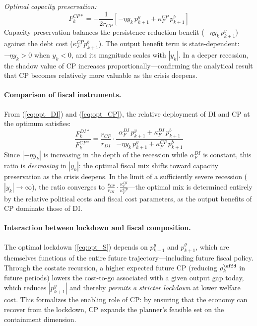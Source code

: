 \documentclass[12pt, a4paper]{article}
\begin{document}
\medskip
\noindent\textit{Optimal capacity preservation:}
%
\begin{equation}
    F_k^{CP*} = -\frac{1}{2 r_{CP}}\left[
      -\eta y_k \, p_{k+1}^y
      + \kappa_F^{CP} \, p_{k+1}^b
    \right]
    \label{eq:opt_CP}
\end{equation}
%
Capacity preservation balances the persistence reduction benefit ($-\eta y_k \, p_{k+1}^y$) against the debt cost ($\kappa_F^{CP} p_{k+1}^b$). The output benefit term is state-dependent: $-\eta y_k > 0$ when $y_k < 0$, and its magnitude scales with $|y_k|$. In a deeper recession, the shadow value of CP increases proportionally---confirming the analytical result that CP becomes relatively more valuable as the crisis deepens.

\paragraph{Comparison of fiscal instruments.} From (\ref{eq:opt_DI}) and (\ref{eq:opt_CP}), the relative deployment of DI and CP at the optimum satisfies:
%
\begin{equation}
    \frac{F_k^{DI*}}{F_k^{CP*}} =
    \frac{r_{CP}}{r_{DI}} \cdot
    \frac{\alpha_F^{DI} \, p_{k+1}^y + \kappa_F^{DI} \, p_{k+1}^b}
         {-\eta y_k \, p_{k+1}^y + \kappa_F^{CP} \, p_{k+1}^b}
    \label{eq:ratio_DI_CP}
\end{equation}
%
Since $|{-\eta y_k}|$ is increasing in the depth of the recession while $\alpha_F^{DI}$ is constant, this ratio is \textit{decreasing} in $|y_k|$: the optimal fiscal mix shifts toward capacity preservation as the crisis deepens. In the limit of a sufficiently severe recession ($|y_k| \to \infty$), the ratio converges to $\frac{r_{CP}}{r_{DI}} \cdot \frac{\kappa_F^{DI}}{\kappa_F^{CP}}$---the optimal mix is determined entirely by the relative political costs and fiscal cost parameters, as the output benefits of CP dominate those of DI.

\paragraph{Interaction between lockdown and fiscal composition.} The optimal lockdown (\ref{eq:opt_S}) depends on $p_{k+1}^y$ and $p_{k+1}^\theta$, which are themselves functions of the entire future trajectory---including future fiscal policy. Through the costate recursion, a higher expected future CP (reducing $\rho_k^{\effd}$ in future periods) lowers the cost-to-go associated with a given output gap today, which reduces $|p_{k+1}^y|$ and thereby \textit{permits a stricter lockdown} at lower welfare cost. This formalizes the enabling role of CP: by ensuring that the economy can recover from the lockdown, CP expands the planner's feasible set on the containment dimension.
\end{document}

